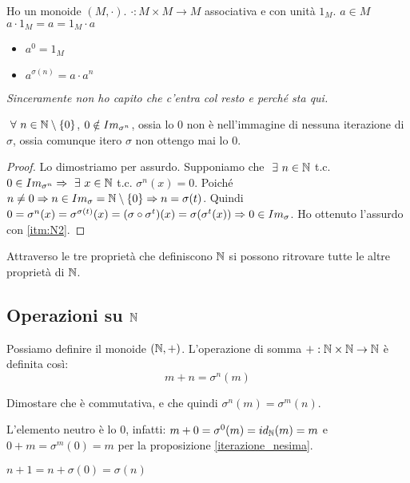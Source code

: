 \begin{defn}[Potenze]
Ho un monoide $(M, \cdot)$. $\cdot : M \times M \to M $ associativa e con unit\`a $1_M$. $a \in M$ $a \cdot 1_M = a = 1_M \cdot a$
\begin{itemize}
  \item $a^0 = 1_M$
  \item $a^{\sigma(n)} = a \cdot a^n$
\end{itemize}
\textit{Sinceramente non ho capito che c'entra col resto e perch\'e sta qui.}
\end{defn}

\begin{prop}
$\forall n \in \naturals \setminus \{ 0 \}$, $0 \notin Im_{\sigma^n}$, ossia lo 0 non \`e nell'immagine di nessuna iterazione di $\sigma$, ossia comunque itero $\sigma$ non ottengo mai lo 0.
\end{prop}
\begin{proof}
Lo dimostriamo per assurdo. Supponiamo che $\exists n \in \naturals$ t.c. $0 \in \image{\sigma^n} \implies \exists x \in \naturals$ t.c. $\sigma^n (x) = 0$. Poich\'e $n \neq 0 \Rightarrow n \in Im_{\sigma} = \mathbb{N} \setminus \{ 0 \} \Rightarrow n = \sigma(t)$. Quindi $0 = \sigma^n(x) = \sigma^{\sigma(t)}(x) = (\sigma \circ \sigma^t)(x) = \sigma(\sigma^t(x)) \Rightarrow 0 \in Im_{\sigma}$. Ho ottenuto l'assurdo con \ref{itm:N2}.
\end{proof}
Attraverso le tre propriet\`a che definiscono $\mathbb{N}$ si possono ritrovare tutte le altre propriet\`a di $\mathbb{N}$. 

\subsection{Operazioni su $\mathbb{N}$}

Possiamo definire il monoide $(\mathbb{N}, +)$. L'operazione di somma $+ : \mathbb{N} \times \mathbb{N} \to \mathbb{N}$ \`e definita cos\`i:
\[
m + n = \sigma^{n}(m)
\]
\begin{esercizio}
Dimostare che \`e commutativa, e che quindi $\sigma^n(m) = \sigma^m(n)$.
\end{esercizio}

L'elemento neutro \`e lo 0, infatti: $ m + 0 = \sigma^0 (m) = id_{\mathbb{N}} (m) = m $ e $ 0 + m = \sigma^m (0) = m $ per la proposizione \ref{iterazione_nesima}.

\begin{oss}
$n + 1 = n + \sigma(0) = \sigma(n)$
\end{oss}

